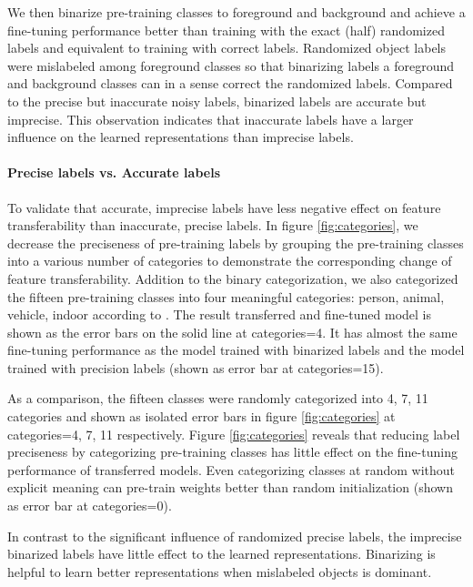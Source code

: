 We then binarize pre-training classes to foreground and background and achieve a fine-tuning performance better than training with the exact (half) randomized labels and equivalent to training with correct labels.
Randomized object labels were mislabeled among foreground classes so that binarizing labels a foreground and background classes can in a sense correct the randomized labels.
Compared to the precise but inaccurate noisy labels, binarized labels are accurate but imprecise.
This observation indicates that inaccurate labels have a larger influence on the learned representations than imprecise labels.


\paragraph{Precise labels vs. Accurate labels}
To validate that accurate, imprecise labels have less negative effect on feature transferability than inaccurate, precise labels.
In figure \ref{fig:categories}, we decrease the preciseness of pre-training labels by grouping the pre-training classes into a various number of categories to demonstrate the corresponding change of feature transferability.
Addition to the binary categorization, we also categorized the fifteen pre-training classes into four meaningful categories: person, animal, vehicle, indoor according to \cite{everingham2015pascal}.
The result transferred and fine-tuned model is shown as the error bars on the solid line at categories=4.
It has almost the same fine-tuning performance as the model trained with binarized labels and the model trained with precision labels (shown as error bar at categories=15).

As a comparison, the fifteen classes were randomly categorized into 4, 7, 11 categories and shown as isolated error bars in figure \ref{fig:categories} at categories=4, 7, 11 respectively.
Figure \ref{fig:categories} reveals that reducing label preciseness by categorizing pre-training classes has little effect on the fine-tuning performance of transferred models.
Even categorizing classes at random without explicit meaning can pre-train weights better than random initialization (shown as error bar at categories=0).

In contrast to the significant influence of randomized precise labels, the imprecise binarized labels have little effect to the learned representations.
Binarizing is helpful to learn better representations when mislabeled objects is dominant.

